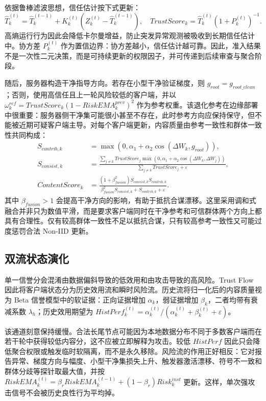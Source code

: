 \documentclass[10pt,a4paper,UTF8,fontset=fandol]{ctexart}
\begin{document}
依据鲁棒滤波思想，信任估计按下式更新：
\begin{equation}
    \hat{T}_{k}^{(t)}=\hat{T}_{k}^{(t-1)}+K_k^{(t)}(Z_k^{(t)}-\hat{T}_{k}^{(t-1)}),\quad
    TrustScore_k=\hat{T}_{k}^{(t)}(1+P_k^{(t)})^{-1}.
\end{equation}
高熵运行行为因此会降低卡尔曼增益，防止突发异常观测被吸收到长期信任估计中。协方差 $P_k^{(t)}$ 作为置信边界：协方差越小，信任估计越可靠。因此，准入结果不是一次性二元决策，而是可持续更新的权限因子，并可传递到后续审查与聚合阶段。

随后，服务器构造干净指导方向。若存在小型干净验证梯度，则 $g_{root}=g_{root\_clean}$；否则，使用高信任且上一轮风险较低的客户端，并以 $\omega_k^{ref}=TrustScore_k(1-RiskEMA_k^{prev})^2$ 作为参考权重。该退化参考在边缘部署中很重要：服务器侧干净集可能很小甚至不存在，此时参考方向应保持保守，但不能被近期可疑客户端主导。对每个客户端更新，内容质量由参考一致性和群体一致性共同构成：
\begin{align}
    S_{contrib,k}  & =\max(0,\alpha_1+\alpha_2\cos(\Delta W_k,g_{root})),                                  \\
    S_{consist,k}  & =\frac{\sum_{j\ne k}TrustScore_j\max(0,\alpha_1+\alpha_2\cos(\Delta W_k,\Delta W_j))}
    {\sum_{j\ne k}TrustScore_j+\varepsilon},                                                               \\
    ContentScore_k & =\frac{(1+\beta_{fusion}^2)S_{consist,k}S_{contrib,k}}
    {\beta_{fusion}^2S_{consist,k}+S_{contrib,k}+\varepsilon}.
\end{align}
其中 $\beta_{fusion}>1$ 会提高干净方向的影响，有助于抵抗合谋漂移。这里采用调和式融合并非只为数值平滑，而是要求客户端同时在干净参考和可信群体两个方向上都具有合理性。仅有较高群体一致性不足以抵抗合谋，只有较高参考一致性又可能过度惩罚合法 Non-IID 更新。

\subsection{双流状态演化}

单一信誉分会混淆由数据偏斜导致的低效用和由攻击导致的高风险。Trust Flow 因此将客户端状态分为历史效用流和瞬时风险流。历史流将归一化后的内容质量视为 Beta 信誉模型中的软证据：正向证据增加 $\alpha_k$，弱证据增加 $\beta_k$，二者均带有衰减系数 $\lambda_h$；历史效用期望为 $HistPerf_k^{(t)}=\alpha_k^{(t)}/(\alpha_k^{(t)}+\beta_k^{(t)}+\varepsilon)$。

该通道刻意保持缓慢。合法长尾节点可能因为本地数据分布不同于多数客户端而在若干轮中获得较低内容分，这不应被立即解释为攻击。较低 $HistPerf$ 因此只会降低聚合权限或触发临时软隔离，而不是永久移除。风险流的作用正好相反：它对报告异常、梯度方向与幅度、小型干净集损失上升、触发器激活漂移、符号不一致和群体分歧等探针取最大值，并按 $RiskEMA_k^{(t)}=\beta_rRiskEMA_k^{(t-1)}+(1-\beta_r)Risk_k^{inst}$ 更新。这样，单次强攻击信号不会被历史良性行为平均掉。
\end{document}
